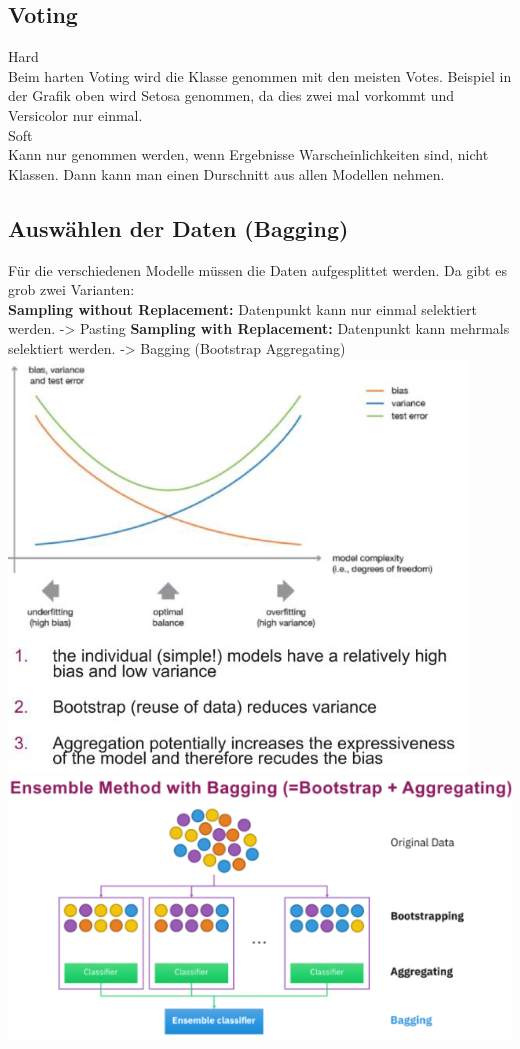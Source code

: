 \subsection{Voting}
\textcolor{myblue}{Hard}\\
Beim harten Voting wird die Klasse genommen mit den meisten Votes. Beispiel in der Grafik oben wird Setosa genommen, da
dies zwei mal vorkommt und Versicolor nur einmal.\\
\textcolor{myblue}{Soft}\\
Kann nur genommen werden, wenn Ergebnisse Warscheinlichkeiten sind, nicht Klassen. Dann kann man einen Durschnitt aus
allen Modellen nehmen.
\subsection{Auswählen der Daten (Bagging)}
Für die verschiedenen Modelle müssen die Daten aufgesplittet werden. Da gibt es grob zwei Varianten:\\
\textbf{Sampling without Replacement:} Datenpunkt kann nur einmal selektiert werden. -> Pasting
\textbf{Sampling with Replacement:} Datenpunkt kann mehrmals selektiert werden. -> Bagging (Bootstrap Aggregating)
\includegraphics[width=\linewidth]{img/choose_data.png}
\includegraphics[width=\linewidth]{img/ensemble_method_bagging.png}
